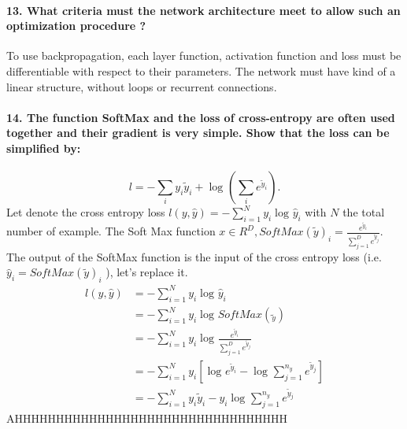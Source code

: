\documentclass{article}
\theoremstyle{plain}%
\theoremstyle{definition}
\theoremstyle{remark}
\begin{document}
\paragraph{13. What criteria must the network architecture meet to allow such an optimization procedure ?}
To use backpropagation, each layer function, activation function and loss must be differentiable with respect to their parameters. The network must have kind of a linear structure, without loops or recurrent connections. 

\paragraph{14. The function SoftMax and the loss of cross-entropy are often used together and their gradient is very simple. Show that the loss can be simpliﬁed by:}
\[
    l = - \sum_{i}^{} y_i \tilde{y}_i + \log_{} (\sum_{i}^{} e^{\tilde{y}_i}) 
.\]
Let denote the cross entropy loss $ l(y, \hat{y}) = - \sum_{i=1}^{N} y_i \log_{} \hat{y}_i $ with $ N $ the total number of example. The Soft Max function $x \in R^D, SoftMax(\tilde{y})_i = \frac{e^{\tilde{y}_i}}{\sum_{j=1}^{D} e^{\tilde{y}_j} } $. The output of the SoftMax function is the input of the cross entropy loss (i.e. $ \hat{y}_i = SoftMax(\tilde{y})_i $ ), let's replace it. 
\begin{align*}
    l(y, \hat{y}) &= - \sum_{i=1}^{N} y_i \log_{} \hat{y}_i \\
        &= - \sum_{i=1}^{N} y_i \log_{} SoftMax(\tilde{_y}) \\
        &= - \sum_{i=1}^{N} y_i \log_{} \frac{e^{\tilde{y}_i}}{\sum_{j=1}^{D} e^{\tilde{y}_j} } \\
        &= - \sum_{i=1}^{N} y_i [ \log_{} e^{\tilde{y}_i} - \log_{} \sum_{j=1}^{n_y} e^{\tilde{y}_j}  ] \\
        &= - \sum_{i=1}^{N} y_i \tilde{y}_i - y_i \log_{} \sum_{j=1}^{n_y}e^{\tilde{y}_j} 
\end{align*}
AHHHHHHHHHHHHHHHHHHHHHHHHHHHHHHHHH
\end{document}
